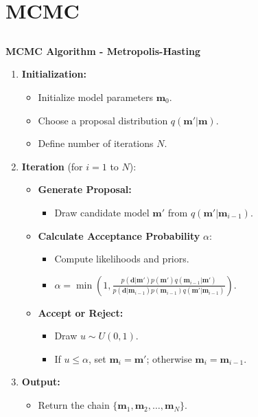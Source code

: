 \documentclass[aspectratio=169]{beamer}
\begin{document}
\section{MCMC}
\subsection{}

\begin{frame}{\textbf{MCMC Algorithm - Metropolis-Hasting}}
    \begin{enumerate}
        \item \textbf{Initialization:}
        \begin{itemize}
            \item Initialize model parameters $\mathbf{m}_0$.
            \item Choose a proposal distribution $q(\mathbf{m}'|\mathbf{m})$.
            \item Define number of iterations $N$.
        \end{itemize}
        
        \item \textbf{Iteration} (for $i = 1$ to $N$):
        \begin{itemize}
            \item \textbf{Generate Proposal:}
            \begin{itemize}
                \item Draw candidate model $\mathbf{m}'$ from $q(\mathbf{m}'|\mathbf{m}_{i-1})$.
            \end{itemize}
            \item \textbf{Calculate Acceptance Probability} $\alpha$:
            \begin{itemize}
                \item Compute likelihoods and priors.
                \item $\alpha = \min \left(1, \frac{p(\mathbf{d}|\mathbf{m}') p(\mathbf{m}') q(\mathbf{m}_{i-1}|\mathbf{m}')}{p(\mathbf{d}|\mathbf{m}_{i-1}) p(\mathbf{m}_{i-1}) q(\mathbf{m}'|\mathbf{m}_{i-1})} \right)$.
            \end{itemize}
            \item \textbf{Accept or Reject:}
            \begin{itemize}
                \item Draw $u \sim U(0, 1)$.
                \item If $u \leq \alpha$, set $\mathbf{m}_i = \mathbf{m}'$; otherwise $\mathbf{m}_i = \mathbf{m}_{i-1}$.
            \end{itemize}
        \end{itemize}
        
        \item \textbf{Output:}
        \begin{itemize}
            \item Return the chain $\{\mathbf{m}_1, \mathbf{m}_2, \ldots, \mathbf{m}_N\}$.
        \end{itemize}
    \end{enumerate}
\end{frame}
\end{document}
